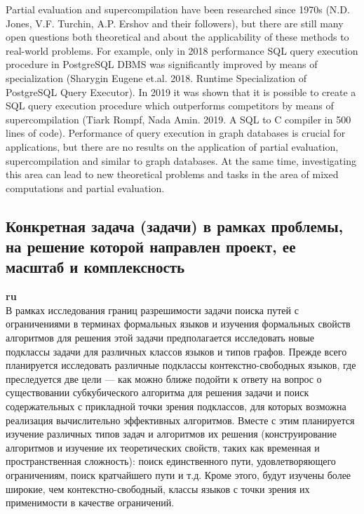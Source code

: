 \documentclass[12pt]{article}  %
\theoremstyle{remark}
\begin{document}
Partial evaluation and supercompilation have been researched since 1970s (N.D. Jones, V.F. Turchin, A.P. Ershov and their followers), but there are still many open questions both theoretical and about the applicability of these methods to real-world problems. 
For example, only in 2018 performance SQL query execution procedure in PostgreSQL DBMS was significantly improved by means of specialization (Sharygin Eugene et.al. 2018. Runtime Specialization of PostgreSQL Query Executor). 
In 2019 it was shown that it is possible to create a SQL query execution procedure which outperforms competitors by means of supercompilation (Tiark Rompf, Nada Amin. 2019. A SQL to C compiler in 500 lines of code). 
Performance of query execution in graph databases is crucial for applications, but there are no results on the application of partial evaluation, supercompilation and similar to graph databases. 
At the same time, investigating this area can lead to new theoretical problems and tasks in the area of mixed computations and partial evaluation.

\subsection{Конкретная задача (задачи) в рамках проблемы, на решение которой направлен проект, ее масштаб и комплексность}

\textbf{ru}\\
%
В рамках исследования границ разрешимости задачи поиска путей с ограничениями в терминах формальных языков и изучения формальных свойств алгоритмов для решения этой задачи предполагается исследовать новые подклассы задачи для различных классов языков и типов графов. Прежде всего планируется исследовать различные подклассы контекстно-свободных языков, где преследуется две цели --- как можно ближе подойти к ответу на вопрос о существовании субкубического алгоритма для решения задачи и поиск содержательных с прикладной точки зрения подклассов, для которых возможна реализация вычислительно эффективных алгоритмов. Вместе с этим планируется изучение различных типов задач и алгоритмов их решения (конструирование алгоритмов и изучение их теоретических свойств, таких как временная и пространственная сложность): поиск единственного пути, удовлетворяющего ограничениям, поиск кратчайшего пути и т.д. Кроме этого, будут изучены более широкие, чем контекстно-свободный, классы языков с точки зрения их применимости в качестве ограничений.
\end{document}
